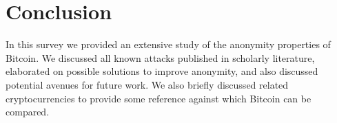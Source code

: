 \section{Conclusion}
In this survey we provided an extensive study of the anonymity properties of Bitcoin. We discussed all known attacks published in scholarly literature, elaborated on possible solutions to improve anonymity, and also discussed potential avenues for future work. We also briefly discussed related cryptocurrencies to provide some reference against which Bitcoin can be compared.